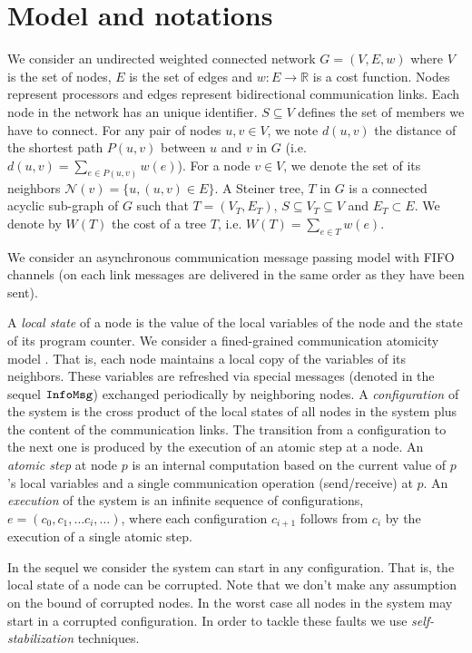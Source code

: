 \documentclass[11pt]{article}
\newcommand{\InfoMsg}{\mbox{\tt InfoMsg}}
\begin{document}
\section{Model and notations} 
\label{sec:model}
We consider an undirected weighted connected network $G=(V,E,w)$ where
$V$ is the set of nodes, $E$ is the set of edges and $w: E \rightarrow
{\mathbb R}$ is a cost function. Nodes represent processors and edges
represent bidirectional communication links. Each node in the network
has an unique identifier. 
$S \subseteq V$ defines the set of members we have to connect. For any pair of nodes $u,v \in V$, we note $d(u,v)$ the distance of the shortest path $P(u,v)$ between $u$ and $v$ in $G$ (i.e. $d(u,v)=\sum_{e \in P(u,v)} w(e)$). For a node $v \in V$, we denote the set of its neighbors ${\mathcal N(v)}=\{u, (u,v) \in E\}$. A Steiner tree, $T$ in $G$ is a connected acyclic sub-graph of $G$ such that $T=(V_{T},E_{T})$, $S \subseteq V_{T} \subseteq V$ and $E_{T} \subset E$. We denote by $W(T)$ the cost of a tree $T$, i.e. $W(T)=\sum_{e \in T} w(e)$.



We consider an asynchronous communication message passing model with
FIFO channels (on each link messages are delivered in the same order as
they have been sent).

A {\it local state} of a node is the value of the local variables of
the node and the state of its program counter. 
We consider a fined-grained communication atomicity model \cite{BK07,Dol00}. That is,
each node maintains a local copy of the variables of its
neighbors. These variables are refreshed via special
messages (denoted in the sequel $\InfoMsg$) exchanged periodically 
by neighboring nodes.
A {\it configuration} of the
system is the cross product of the local states of all nodes in the
system plus the content of the communication links. 
The transition from a configuration to the next one is produced by the
execution of an atomic step at a node. An {\it atomic step} at node $p$ 
is an internal computation based on the
current value of $p$'s local variables and a single communication
operation (send/receive) at $p$. 
An {\it execution} of the system is an infinite sequence of
configurations, $e=(c_0, c_1, \ldots c_i, \ldots)$, where each
configuration $c_{i+1}$ follows from $c_i$ by the execution 
of a single atomic step.

In the sequel we consider the system can start in any
configuration. That is, the local state of a node can be corrupted.
Note that we don't make any assumption on the bound of
corrupted nodes. In the worst case all nodes in the system 
may start in a corrupted configuration.
In order to tackle these faults we use {\it self-stabilization} techniques.
\end{document}
